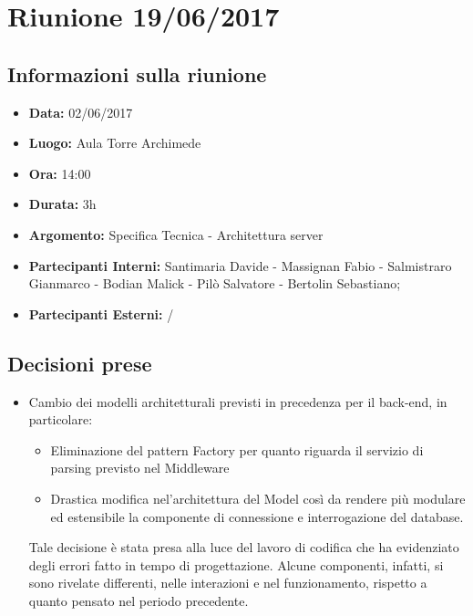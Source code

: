 \section{Riunione 19/06/2017}
  \subsection{Informazioni sulla riunione}
    \begin{itemize}
      \item \textbf{Data: }02/06/2017
      \item \textbf{Luogo: }Aula Torre Archimede
      \item \textbf{Ora: }14:00
      \item \textbf{Durata: }3h
      \item \textbf{Argomento: }Specifica Tecnica - Architettura server
      \item \textbf{Partecipanti Interni: }Santimaria Davide - Massignan Fabio - Salmistraro Gianmarco - Bodian Malick - Pilò Salvatore - Bertolin Sebastiano;
      \item \textbf{Partecipanti Esterni: }/
    \end{itemize}
  \subsection{Decisioni prese}
		\begin{itemize}
			\item Cambio dei modelli architetturali previsti in precedenza per il back-end, in particolare:
      \begin{itemize}
        \item Eliminazione del pattern Factory per quanto riguarda il servizio di parsing previsto nel Middleware
        \item Drastica modifica nel'architettura del Model così da rendere più modulare ed estensibile la componente di connessione e interrogazione del database.
      \end{itemize}
      Tale decisione è stata presa alla luce del lavoro di codifica che ha evidenziato degli errori fatto in tempo di progettazione.
      Alcune componenti, infatti, si sono rivelate differenti, nelle interazioni e nel funzionamento, rispetto a quanto pensato nel periodo precedente.
		\end{itemize}
